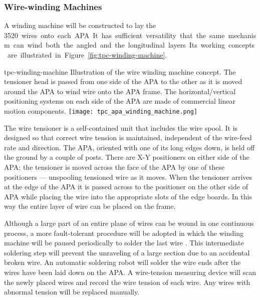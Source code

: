\subsubsection{Wire-winding Machines}
\label{subsec:fd-ref-wirewinding}

A winding machine will be constructed to lay the \SI{3520} wires onto each
APA. It has sufficient versatility that the same mechanism can wind
both the angled and the longitudinal layers.
 
Its working concepts are illustrated in
Figure~\ref{fig:tpc-winding-machine}.
\begin{cdrfigure}{tpc-winding-machine}
{Illustration of the wire winding machine concept.  The tensioner 
head is passed from one side of the APA to the other as it is moved 
around the APA to wind wire onto the APA frame.  The horizontal/vertical 
positioning systems on each side of the APA are made of commercial linear motion components. }
\texttt{[image: tpc\_apa\_winding\_machine.png]}
\end{cdrfigure}
The wire tensioner is a self-contained unit that includes the wire
spool.  It is designed so that correct wire tension is maintained,
independent of the wire-feed rate and direction.  The APA,
oriented with one of its long edges down, is held off
the ground by a couple of posts.   There
are X-Y positioners on either side of the APA; the tensioner is moved
across the face of the APA by one of these positioners --- unspooling
tensioned wire as it moves.  When the tensioner arrives at the edge of
the APA it is passed across to the positioner on the other side of APA
while placing the wire into the appropriate slots of the edge
boards.  In this way the entire layer of wire can be placed on the
frame. 

Although a large part of an entire plane of wires can be wound in one
continuous process, a more fault-tolerant procedure will be adopted in which %
the winding machine will be paused periodically to solder the last wire . This
intermediate soldering step will prevent the unraveling of a large
section due to an accidental broken wire.  An automatic soldering
robot will solder the wire ends after the wires have been laid down on
the APA. A wire-tension measuring device will scan the newly placed
wires and record the wire tension of each wire. Any wires with
abnormal tension will be replaced manually.


